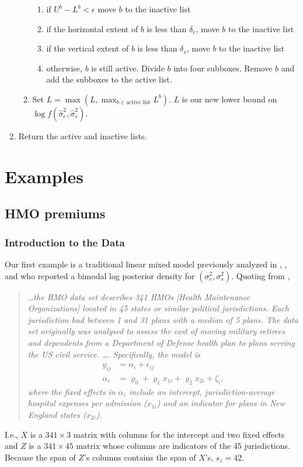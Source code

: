 \documentclass{report}
\newcommand{\RL}{f}
\newcommand{\logRL}{\log\RL}
\newcommand{\sigssq}{\sigma_s^2}
\newcommand{\sigesq}{\sigma_e^2}
\newcommand{\sshat}{\hat\sigma^2_e,\hat\sigma^2_s}
\begin{document}
\begin{enumerate}
\begin{enumerate}
\begin{enumerate}
		\item if $U^b - L^b < \epsilon$ move $b$ to the inactive list
		\item if the horizontal extent of $b$ is less than $\delta_e$,
			move $b$ to the inactive list
		\item if the vertical extent of $b$ is less than $\delta_s$,
			move $b$ to the inactive list
		\item otherwise, $b$ is still active.  Divide $b$ into four subboxes.
			Remove $b$ and add the subboxes to the active list.
		\end{enumerate}
	\item Set $L = \max ( L, \max_{b\in \text{active list}}L^b )$.  $L$ is our new
		lower bound on $\logRL(\sshat)$.
	\end{enumerate}
\item Return the active and inactive lists.
\end{enumerate}

\section{Examples}

\subsection{HMO premiums}
\subsubsection{Introduction to the Data}
Our first example is a traditional linear mixed model previously analyzed in \cite{hodges:98}, \cite{hodges:2013}, and \cite{henn&hodges:2014} who reported a bimodal log posterior density for $(\sigesq,\sigssq)$.  Quoting from \cite{henn&hodges:2014},
\begin{quote}
\itshape
\dots the HMO data set describes 341 HMOs [Health Maintenance Organizations] located in 45 states or similar political jurisdictions.  Each jurisdiction had between 1 and 31 plans with a median of 5 plans.  The data set originally was analysed to assess the cost of moving military retirees and dependents from a Department of Defense health plan to plans serving the US civil service.  \dots.  Specifically, the model is
\begin{equation*}
\begin{split}
	y_{ij} &= \alpha_i + \epsilon_{ij}\\
	\alpha_i &= \varrho_0 + \varrho_1x_{1i} + \varrho_2x_{2i} + \zeta_i,
\end{split}
\end{equation*}
where the fixed effects in $\alpha_i$ include an intercept, jurisdiction-average hospital expenses per admission ($x_{1i}$) and an indicator for plans in New England states ($x_{2i}$).

\upshape
\end{quote}
I.e., $X$ is a $341 \times 3$ matrix with columns for the intercept and two fixed effects and $Z$ is a $341 \times 45$ matrix whose columns are indicators of the 45 jurisdictions.  Because the span of $Z$'s columns contains the span of $X$'s, $s_z = 42$.  
\end{document}
